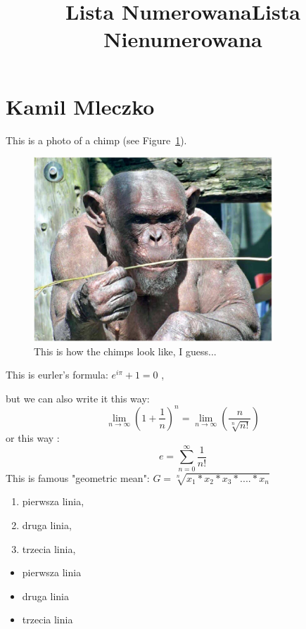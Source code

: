\hline
\section{Kamil Mleczko}
\label{sec: kmleczko}
This is a photo of a chimp (see Figure~\ref{fig:chimp}).
\begin{figure}[h]
    \centering
    \includegraphics[width=0.8\textwidth]{pictures/chimp.jpg}
    \caption{This is how the chimps look like, I guess...}
    \label{fig:chimp}
\end{figure}


This is eurler's formula: $e^{i\pi} + 1 = 0$ ,

but we can also write it this way:
$$ \lim_{n\to\infty} \left(1 + \frac{1}{n}\right)^{n}= 
\lim_{n\to\infty} \left(\frac{n}{\sqrt[n]{n!}}\right)$$
or this way : 
$$e = \sum_{n=0}^{\infty} \frac{1}{n!}$$
This is famous "geometric mean": $G = \sqrt[n]{x_1 * x_2 * x_3 *....* x_n}$
\pageref{fig:chimp}
\newpage
\begin{Huge}
\begin{center}
\title{Lista Numerowana}
\end{center}
\end{Huge}
\begin{enumerate}
    \item pierwsza linia,
    \item druga linia,
    \item trzecia linia,
\end{enumerate}

\begin{Huge}
\begin{center}
    \title{Lista Nienumerowana}
\end{center}
\end{Huge}
\begin{itemize}
    \item pierwsza linia
    \item druga linia
    \item trzecia linia
\end{itemize}

